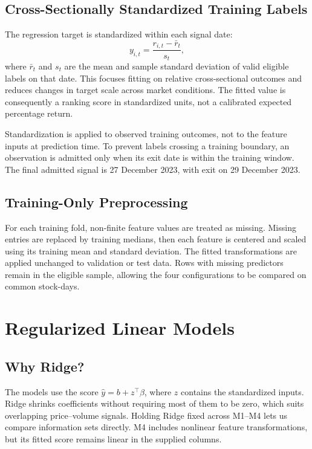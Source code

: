 \documentclass[11pt,a4paper]{article}
\begin{document}
\subsection{Cross-Sectionally Standardized Training Labels}
The regression target is standardized within each signal date:
\begin{equation}
y_{i,t}=\frac{r_{i,t}-\bar r_t}{s_t},
\label{eq:ztarget}
\end{equation}
where $\bar r_t$ and $s_t$ are the mean and sample standard deviation of valid
eligible labels on that date. This focuses fitting on relative cross-sectional
outcomes and reduces changes in target scale across market conditions.
The fitted value is consequently a ranking score in standardized units,
not a calibrated expected percentage return.

Standardization is applied to observed training outcomes, not to the feature
inputs at prediction time. To prevent labels crossing a training boundary,
an observation is admitted only when its exit date is within the training
window. The final admitted signal is 27 December 2023, with exit on
29 December 2023.

\subsection{Training-Only Preprocessing}
For each training fold, non-finite feature values are treated as missing.
Missing entries are replaced by training medians, then each feature is
centered and scaled using its training mean and standard deviation.
The fitted transformations are applied unchanged to validation or test data.
Rows with missing predictors remain in the eligible sample, allowing the
four configurations to be compared on common stock-days.

\section{Regularized Linear Models}
\label{sec:models}
\subsection{Why Ridge?}
The models use the score $\hat y=b+z^\top\beta$, where $z$ contains the
standardized inputs. Ridge shrinks coefficients without requiring most of
them to be zero, which suits overlapping price--volume signals. Holding
Ridge fixed across M1--M4 lets us compare information sets directly.
M4 includes nonlinear feature transformations, but its fitted score remains
linear in the supplied columns.
\end{document}
